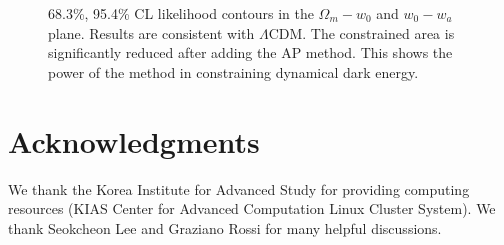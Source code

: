 \documentclass[useAMS,usenatbib]{mnras}
\begin{document}
\begin{figure}
   \caption{\label{fig_TpCF}
   68.3\%, 95.4\% CL likelihood contours in the $\Omega_m-w_0$ and $w_0-w_a$ plane.
   Results are consistent with $\Lambda$CDM.
   The constrained area is significantly reduced after adding the AP method.
   This shows the power of the method in constraining dynamical dark energy.
   }
\end{figure}




\section*{Acknowledgments}

We thank the Korea Institute for Advanced Study for providing computing resources (KIAS Center for Advanced Computation Linux Cluster System).
We thank Seokcheon Lee and Graziano Rossi for many helpful discussions.
\end{document}
